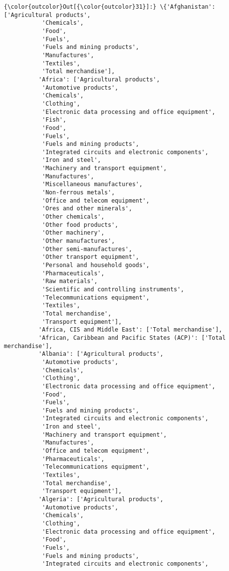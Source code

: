 \documentclass[11pt]{article}
\begin{document}
\begin{Verbatim}[commandchars=\\\{\}]
{\color{outcolor}Out[{\color{outcolor}31}]:} \{'Afghanistan': ['Agricultural products',
           'Chemicals',
           'Food',
           'Fuels',
           'Fuels and mining products',
           'Manufactures',
           'Textiles',
           'Total merchandise'],
          'Africa': ['Agricultural products',
           'Automotive products',
           'Chemicals',
           'Clothing',
           'Electronic data processing and office equipment',
           'Fish',
           'Food',
           'Fuels',
           'Fuels and mining products',
           'Integrated circuits and electronic components',
           'Iron and steel',
           'Machinery and transport equipment',
           'Manufactures',
           'Miscellaneous manufactures',
           'Non-ferrous metals',
           'Office and telecom equipment',
           'Ores and other minerals',
           'Other chemicals',
           'Other food products',
           'Other machinery',
           'Other manufactures',
           'Other semi-manufactures',
           'Other transport equipment',
           'Personal and household goods',
           'Pharmaceuticals',
           'Raw materials',
           'Scientific and controlling instruments',
           'Telecommunications equipment',
           'Textiles',
           'Total merchandise',
           'Transport equipment'],
          'Africa, CIS and Middle East': ['Total merchandise'],
          'African, Caribbean and Pacific States (ACP)': ['Total merchandise'],
          'Albania': ['Agricultural products',
           'Automotive products',
           'Chemicals',
           'Clothing',
           'Electronic data processing and office equipment',
           'Food',
           'Fuels',
           'Fuels and mining products',
           'Integrated circuits and electronic components',
           'Iron and steel',
           'Machinery and transport equipment',
           'Manufactures',
           'Office and telecom equipment',
           'Pharmaceuticals',
           'Telecommunications equipment',
           'Textiles',
           'Total merchandise',
           'Transport equipment'],
          'Algeria': ['Agricultural products',
           'Automotive products',
           'Chemicals',
           'Clothing',
           'Electronic data processing and office equipment',
           'Food',
           'Fuels',
           'Fuels and mining products',
           'Integrated circuits and electronic components',

\end{Verbatim}
\end{document}
